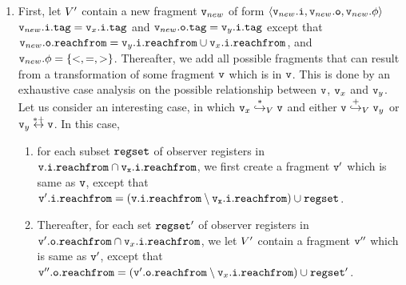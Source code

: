 \begin{enumerate}
  \item
    First, let $V'$ contain a new fragment $\mathtt{v}_{new}$ of form
    $\left\langle\mathtt{v}_{new}.\mathtt{i},\mathtt{v}_{new}.\mathtt{o},\mathtt{v}_{new}.\phi\right\rangle$
    $\mathtt{v}_{new}.\mathtt{i}.\mathtt{tag} = \mathtt{v}_x.\mathtt{i}.\mathtt{tag}$ and $\mathtt{v}_{new}.\mathtt{o}.\mathtt{tag} = \mathtt{v}_y.\mathtt{i}.\mathtt{tag}$ except that $\mathtt{v}_{new}.\mathtt{o}.\mathtt{reachfrom} = \mathtt{v}_y.\mathtt{i}.\mathtt{reachfrom} \cup \mathtt{v}_x.\mathtt{i}.\mathtt{reachfrom}$,
    and $\mathtt{v}_{new}.\phi = \left\{<,=,>\right\}$.
Thereafter, we add all possible fragments that can result from a transformation
of some fragment $\mathtt{v}$ which is in $\mathtt{v}$. This is done by an exhaustive
case analysis on the possible
relationship between $\mathtt{v}$, $\mathtt{v}_x$ and $\mathtt{v}_y$.
Let us consider an interesting case, in which
$\mathtt{v}_x \overset{*}\hookrightarrow_{V} \mathtt{v}$ and either $\mathtt{v} \overset{+}\hookrightarrow_{V} \mathtt{v}_y$ or $\mathtt{v}_y \overset{*+}\leftrightarrow \mathtt{v}$.
In this case,
\begin{enumerate}
\item
  for each subset $\mathtt{regset}$ of observer registers in $\tt \mathtt{v}.\mathtt{i}.\mathtt{reachfrom} \cap \mathtt{v}_x.\mathtt{i}.\mathtt{reachfrom}$, we first create
  a fragment $\mathtt{v}'$ which is same as $\mathtt{v}$, except that $\mathtt{v}'.\mathtt{i}.\mathtt{reachfrom} = (\tt \mathtt{v}.\mathtt{i}.\mathtt{reachfrom} \setminus \mathtt{v}_x.\mathtt{i}.\mathtt{reachfrom}) \cup \mathtt{regset}$.
\item
  Thereafter, 
for each set $\mathtt{regset}'$ of observer registers in $\mathtt{v}'.\mathtt{o}.\mathtt{reachfrom} \cap \mathtt{v}_x.\mathtt{i}.\mathtt{reachfrom}$,  we let $V'$ contain a fragment
$\mathtt{v}''$ which is same as $\mathtt{v}'$, except that $\mathtt{v}''.\mathtt{o}.\mathtt{reachfrom} = (\mathtt{v}'.\mathtt{o}.\mathtt{reachfrom} \setminus \mathtt{v}_x.\mathtt{i}.\mathtt{reachfrom}) \cup \mathtt{regset}'$. 
\end{enumerate}
\end{enumerate}

